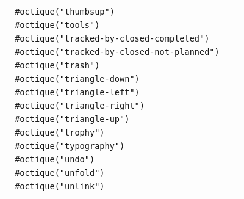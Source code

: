 \begin{longtable}[]{@{}lc@{}}
\texttt{\ \#octique("thumbsup")\ } &
\pandocbounded{} \\
\texttt{\ \#octique("tools")\ } &
\pandocbounded{} \\
\texttt{\ \#octique("tracked-by-closed-completed")\ } &
\pandocbounded{} \\
\texttt{\ \#octique("tracked-by-closed-not-planned")\ } &
\pandocbounded{} \\
\texttt{\ \#octique("trash")\ } &
\pandocbounded{} \\
\texttt{\ \#octique("triangle-down")\ } &
\pandocbounded{} \\
\texttt{\ \#octique("triangle-left")\ } &
\pandocbounded{} \\
\texttt{\ \#octique("triangle-right")\ } &
\pandocbounded{} \\
\texttt{\ \#octique("triangle-up")\ } &
\pandocbounded{} \\
\texttt{\ \#octique("trophy")\ } &
\pandocbounded{} \\
\texttt{\ \#octique("typography")\ } &
\pandocbounded{} \\
\texttt{\ \#octique("undo")\ } &
\pandocbounded{} \\
\texttt{\ \#octique("unfold")\ } &
\pandocbounded{} \\
\texttt{\ \#octique("unlink")\ } &
\pandocbounded{} \\

\end{longtable}
